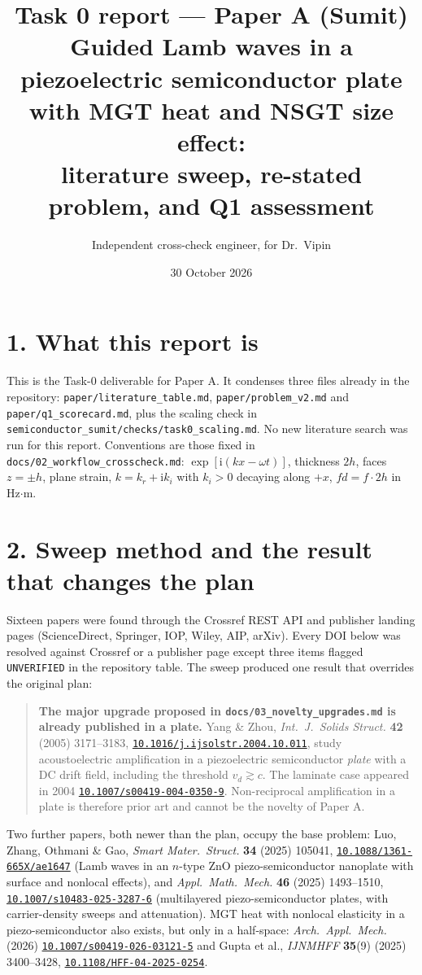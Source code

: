 \documentclass[11pt]{article}
\title{\vspace{-1.2cm}\textbf{Task 0 report --- Paper A (Sumit)}\\[2pt]
\large Guided Lamb waves in a piezoelectric semiconductor plate with MGT heat and NSGT size effect:\\
literature sweep, re-stated problem, and Q1 assessment}
\author{Independent cross-check engineer, for Dr.\ Vipin}
\date{30 October 2026}
\newcommand{\doi}[1]{\href{https://doi.org/#1}{\texttt{#1}}}
\begin{document}
\maketitle
\vspace{-0.5cm}

\section*{1. What this report is}
This is the Task-0 deliverable for Paper A. It condenses three files already in the repository:
\texttt{paper/literature\_table.md}, \texttt{paper/problem\_v2.md} and \texttt{paper/q1\_scorecard.md},
plus the scaling check in \texttt{semiconductor\_sumit/checks/task0\_scaling.md}. No new literature search was run for
this report. Conventions are those fixed in \texttt{docs/02\_workflow\_crosscheck.md}:
$\exp[\mathrm{i}(kx-\omega t)]$, thickness $2h$, faces $z=\pm h$, plane strain,
$k=k_r+\mathrm{i}k_i$ with $k_i>0$ decaying along $+x$, $fd=f\cdot 2h$ in Hz$\cdot$m.

\section*{2. Sweep method and the result that changes the plan}
Sixteen papers were found through the Crossref REST API and publisher landing pages
(ScienceDirect, Springer, IOP, Wiley, AIP, arXiv). Every DOI below was resolved against Crossref
or a publisher page except three items flagged \texttt{UNVERIFIED} in the repository table.
The sweep produced one result that overrides the original plan:

\begin{quote}
\textbf{The major upgrade proposed in \texttt{docs/03\_novelty\_upgrades.md} is already published
in a plate.} Yang \& Zhou, \emph{Int.\ J.\ Solids Struct.} \textbf{42} (2005) 3171--3183,
\doi{10.1016/j.ijsolstr.2004.10.011}, study acoustoelectric amplification in a piezoelectric
semiconductor \emph{plate} with a DC drift field, including the threshold $v_d\gtrsim c$.
The laminate case appeared in 2004 \doi{10.1007/s00419-004-0350-9}. Non-reciprocal amplification
in a plate is therefore prior art and cannot be the novelty of Paper A.
\end{quote}

Two further papers, both newer than the plan, occupy the base problem: Luo, Zhang, Othmani \& Gao,
\emph{Smart Mater.\ Struct.} \textbf{34} (2025) 105041, \doi{10.1088/1361-665X/ae1647}
(Lamb waves in an $n$-type ZnO piezo-semiconductor nanoplate with surface and nonlocal effects),
and \emph{Appl.\ Math.\ Mech.} \textbf{46} (2025) 1493--1510, \doi{10.1007/s10483-025-3287-6}
(multilayered piezo-semiconductor plates, with carrier-density sweeps and attenuation).
MGT heat with nonlocal elasticity in a piezo-semiconductor also exists, but only in a half-space:
\emph{Arch.\ Appl.\ Mech.} (2026) \doi{10.1007/s00419-026-03121-5} and
Gupta et al., \emph{IJNMHFF} \textbf{35}(9) (2025) 3400--3428, \doi{10.1108/HFF-04-2025-0254}.
\end{document}
